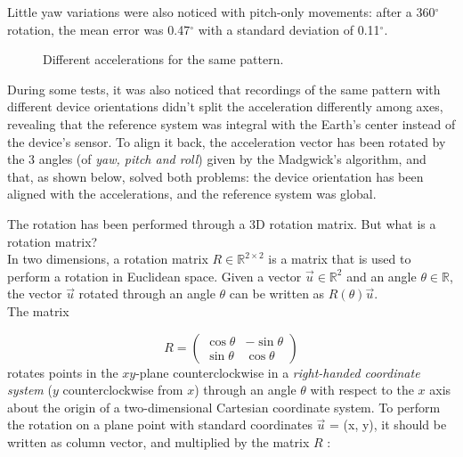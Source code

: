 Little yaw variations were also noticed with pitch-only movements: after a 360$^{\circ}$ rotation, the mean error was 0.47$^{\circ}$ with a standard deviation of 0.11$^{\circ}$.

\begin{center}
	\begin{figure}[ht!]
		\caption{Different accelerations for the same pattern.}
	\end{figure}
\end{center}

During some tests, it was also noticed that recordings of the same pattern with different device orientations didn't split the acceleration differently among axes, revealing that the reference system was integral with the Earth's center instead of the device's sensor. To align it back, the acceleration vector has been rotated by the 3 angles (of \textit{yaw, pitch and roll}) given by the Madgwick's algorithm, and that, as shown below, solved both problems: the device orientation has been aligned with the accelerations, and the reference system was global.
\bigbreak

The rotation has been performed through a 3D rotation matrix. But what is a rotation matrix?\\
In two dimensions, a rotation matrix $R \in \mathbb R^{2 \times 2}$ is a matrix that is used to perform a rotation in Euclidean space. Given a vector $\vec u \in \mathbb R^2$ and an angle $\theta \in \mathbb R$, the vector $\vec u$ rotated through an angle $\theta$ can be written as $R(\theta) \vec u$.\\
The matrix

\[
	R =
	{\begin{pmatrix}
		\cos \theta & -\sin \theta \\
		\sin \theta & \cos \theta
	\end{pmatrix}}
\]
rotates points in the $xy$-plane counterclockwise in a \textit{right-handed coordinate system} ($y$ counterclockwise from $x$) through an angle $\theta$ with respect to the $x$ axis about the origin of a two-dimensional Cartesian coordinate system. To perform the rotation on a plane point with standard coordinates $\vec u$ = (x, y), it should be written as column vector, and multiplied by the matrix $R$ \cite{WikipediaRotationM}:
\bigbreak

